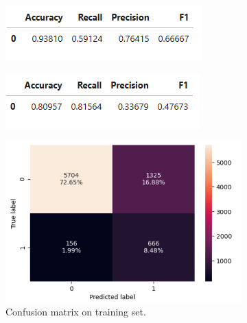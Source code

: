 \documentclass[12pt,a4paper]{article}
\begin{document}
	\begin{figure}[h]
		\centering
		\begin{subfigure}[t]{0.49\textwidth}
			\includegraphics[width=\textwidth]{nb_train_perf.png}
			\caption{}
			\label{fig:nb_train_perf}
		\end{subfigure}
		\hfill
		\begin{subfigure}[t]{0.49\textwidth}
			\includegraphics[width=\textwidth]{nb_test_perf.png}
			\caption{}
			\label{fig:nb_test_perf}
		\end{subfigure}
		\begin{subfigure}[t]{0.5\textwidth}
			\includegraphics[width=\textwidth]{nb_c_Matrix_train.png}
			\caption{Confusion matrix on training set.}
			\label{fig:nb_c_Matrix_train}
		\end{subfigure}
		\hfill
		\begin{subfigure}[t]{0.45\textwidth}

\end{subfigure}
\end{figure}
\end{document}
